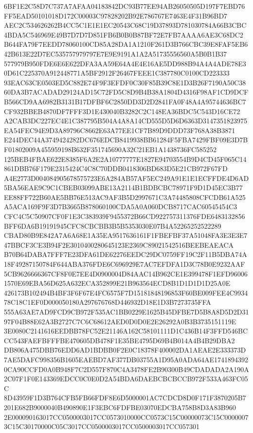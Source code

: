 \documentclass[UTF8,fontset=fandol,zihao=-4,a4paper]{ctexart}
\begin{document}
{{6BF1E2C58D7C737A7AFAA04183842DC93B77EE94AB26050505D197F7EBD76FF5EAD50101018D172C00003C97828202B92E786767E7463E4F31B96BD7
AEC2C534626262B4CC5C1E1E1EC20543C68C19D37893D781030784A66B3CBC4BDA5C546969E49B7D7D7D851FB6B0B0B87BF72E7FB7AAAA6AE3C68DC2
B644FA79F7EEDD78060100CD85A28DA1A1210F261D3B766CBC39E8FAF5EB642B613E22D7EC535757979797E7E9E9191A1A2A51735556560A5B0B1B37
577979B950FDE6E6E622DFA3AA59E64A4E4E16AE5DD988B94A4A4ADE78E30D61C225370A912448771A5BF2912F26467FEEE1C387780C0100CD223333
93EAC63CE0503ED5C882E74F9F3EFDF0C30F85B39C8E1D3B26F7190A50C3860DA3B7ACADAD29124AD15C72FD5C8D9B4B38A1804D4316F98AF1CD9DCF
B566CD9AA6982B3131B17DFBF6C2850DD3D2D2841FA0F48A4A95744636BC7CF932BBEB4870DF7FFF3D1E430040B3282C2C148EA36BDC5C543D16CE72
A2CAB3DC227EC4E1C387795B504A4A8A14CD555D5D6D6363D3147351823975EA54FEC94E9D3A89796C8662E63A77EE1CF7B89D9DDD73F768A38B3871
E244DEC44A3749424282DC676EDCB8419938BB61284F5FBA7429FBF09E3D7BF01802009A455959198B632F351745690A32C21EB1A1438736FC585252
125BEB4FBAE622E8385F6A2E2A10777777E1827E94703554B9D4CD45F065C14861DBB76F179E2315424C4C8C70DDB0418306BD683D5E21CB972F67FD
A4E2773D004084905678575723E6A284AB57AF5EC249A91E1E1ECFFDE4D6AD5BA56EAE9C9C1CBEB03099ABE13A2114B1BDBCBC78971F9D1D45EC3B77
EE88FF722B60AE5BB76E513AC9AF3B5D2997671C3A74485808CFCDB61A525A5ACA169F9F3D7B3665B878060100CDA5A0A060DCB8717CAC60545454C3
CFC4C5C50907CF0F1E3C383939F9455372B66CD922757311376FDE6483132856BFF6DA6B19191945CFC8CBCBB3B5B5353030E07B4A52265252522289
CBAD80B9E842A7A6A68E1A35EA9517636161F1FBEFBF37A51048FA3E3E3E747BBCF3CE3B94F2E3010400280645123E2369C89021542516BEEBEAEACA
B70B64DABA7FFF7E23DFA61DE62276EEDC29DC0759FF19C2F11B5DBA74A18F49287150784F644ABA376FDE6C696929E7AC7EFDFA1D3C78B0E9232AAF
5CB9626666367CF8F0E7EE4D0900004D84AAC14B962CE1E399478F1EFD960061570E69EBA56D625A632ECA352899E21B963564ECD8B1D1D1D1D25A0E
426173B102494B4BF3F6F67E4FC6575F7D15181848196853F60BE009FEE4C993478C18C1EF0D000050180A297676768D446932D18E1D3B7273735FFA
555A63AE7AD9FCD9CB972F535AC1BB0229E1625B45DFBE7D5B8A8D5D2D3197F04B88E62A3B2727C7C6C68612AED0D0D0E2E26292A0B3B3735151119E
3E0080C2141616EEDBB78FC52E21146A162C58101111D1C436B14F3FFD546BCCC543FAEFBFFFBE470605DB478F1E35BE4795D69B4B014A4B4B29DBA2
DB806A475DBB76EDD6AD1BDBB0F2E0C18378F400002DA1AEAE2E333373D7AE5DAFC998356B1605EAEBD7AF377DB03755A1D95A0ADA64AE1741894392
0CA90CCFD0A0B948F7C2D557F870C4A3478FE2B90300B49CDADADA2A190A2C07F1F0E143369EDCC0C0E0D2A54BDA6DAEBCBCBCCB972F533A463FC05C
8D43959F1D3B764CFB5FB66FDF8E6D5000001AC7CDCD8D0F171F3870205B7201E682B9000040B490890E1F3EBC6FDFBE03070EDCBA758B8D3A83B960
2E000090163017CC0500003017CC0573010000CC0573C15C00000073C15C00000073C15C30170000C05C3017CC0500003017CC0500003017CC057301
}}
\end{document}
